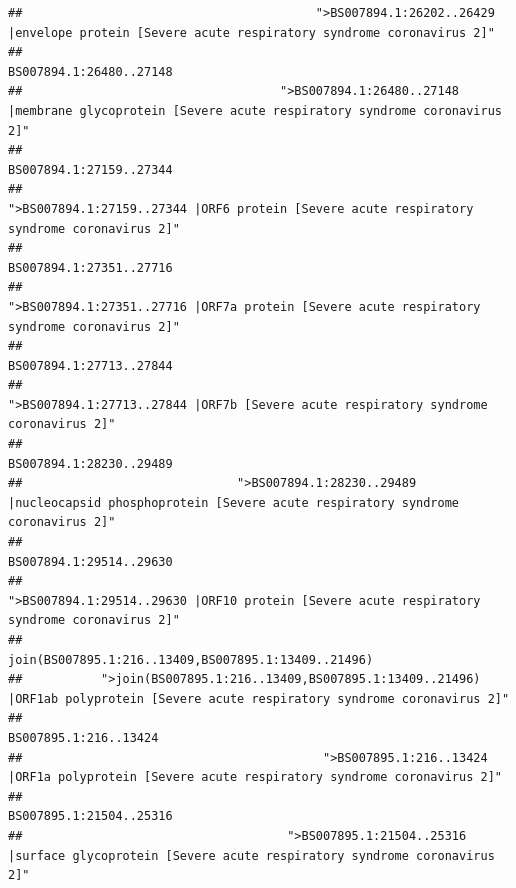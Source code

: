 \documentclass[
]{article}
\begin{document}
\begin{verbatim}
##                                         ">BS007894.1:26202..26429 |envelope protein [Severe acute respiratory syndrome coronavirus 2]" 
##                                                                                                                BS007894.1:26480..27148 
##                                    ">BS007894.1:26480..27148 |membrane glycoprotein [Severe acute respiratory syndrome coronavirus 2]" 
##                                                                                                                BS007894.1:27159..27344 
##                                             ">BS007894.1:27159..27344 |ORF6 protein [Severe acute respiratory syndrome coronavirus 2]" 
##                                                                                                                BS007894.1:27351..27716 
##                                            ">BS007894.1:27351..27716 |ORF7a protein [Severe acute respiratory syndrome coronavirus 2]" 
##                                                                                                                BS007894.1:27713..27844 
##                                                    ">BS007894.1:27713..27844 |ORF7b [Severe acute respiratory syndrome coronavirus 2]" 
##                                                                                                                BS007894.1:28230..29489 
##                              ">BS007894.1:28230..29489 |nucleocapsid phosphoprotein [Severe acute respiratory syndrome coronavirus 2]" 
##                                                                                                                BS007894.1:29514..29630 
##                                            ">BS007894.1:29514..29630 |ORF10 protein [Severe acute respiratory syndrome coronavirus 2]" 
##                                                                                    join(BS007895.1:216..13409,BS007895.1:13409..21496) 
##           ">join(BS007895.1:216..13409,BS007895.1:13409..21496) |ORF1ab polyprotein [Severe acute respiratory syndrome coronavirus 2]" 
##                                                                                                                  BS007895.1:216..13424 
##                                          ">BS007895.1:216..13424 |ORF1a polyprotein [Severe acute respiratory syndrome coronavirus 2]" 
##                                                                                                                BS007895.1:21504..25316 
##                                     ">BS007895.1:21504..25316 |surface glycoprotein [Severe acute respiratory syndrome coronavirus 2]" 

\end{verbatim}
\end{document}
